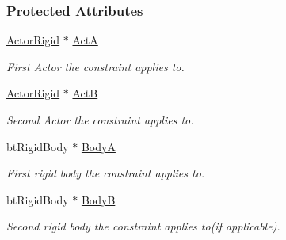 \subsubsection*{Protected Attributes}
\begin{DoxyCompactItemize}
\item 
\hypertarget{classphys_1_1TypedConstraint_abf3aca95fd128c2c38c525a68618bb58}{
\hyperlink{classphys_1_1ActorRigid}{ActorRigid} $\ast$ \hyperlink{classphys_1_1TypedConstraint_abf3aca95fd128c2c38c525a68618bb58}{ActA}}
\label{classphys_1_1TypedConstraint_abf3aca95fd128c2c38c525a68618bb58}

\begin{DoxyCompactList}\small\item\em First Actor the constraint applies to. \item\end{DoxyCompactList}\item 
\hypertarget{classphys_1_1TypedConstraint_a99b05f3bd6001d39b12dd5804abfd71b}{
\hyperlink{classphys_1_1ActorRigid}{ActorRigid} $\ast$ \hyperlink{classphys_1_1TypedConstraint_a99b05f3bd6001d39b12dd5804abfd71b}{ActB}}
\label{classphys_1_1TypedConstraint_a99b05f3bd6001d39b12dd5804abfd71b}

\begin{DoxyCompactList}\small\item\em Second Actor the constraint applies to. \item\end{DoxyCompactList}\item 
\hypertarget{classphys_1_1TypedConstraint_a5e4251df846e7afbab2e49039530a140}{
btRigidBody $\ast$ \hyperlink{classphys_1_1TypedConstraint_a5e4251df846e7afbab2e49039530a140}{BodyA}}
\label{classphys_1_1TypedConstraint_a5e4251df846e7afbab2e49039530a140}

\begin{DoxyCompactList}\small\item\em First rigid body the constraint applies to. \item\end{DoxyCompactList}\item 
\hypertarget{classphys_1_1TypedConstraint_ab90a86274d18f45628e91a76d28c8278}{
btRigidBody $\ast$ \hyperlink{classphys_1_1TypedConstraint_ab90a86274d18f45628e91a76d28c8278}{BodyB}}
\label{classphys_1_1TypedConstraint_ab90a86274d18f45628e91a76d28c8278}

\begin{DoxyCompactList}\small\item\em Second rigid body the constraint applies to(if applicable). \item\end{DoxyCompactList}\end{DoxyCompactItemize}
